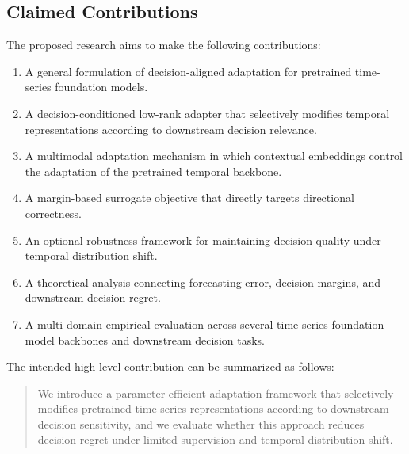 \documentclass[11pt]{article}
\begin{document}
\subsection{Claimed Contributions}

The proposed research aims to make the following contributions:

\begin{enumerate}
    \item A general formulation of decision-aligned adaptation for pretrained
    time-series foundation models.

    \item A decision-conditioned low-rank adapter that selectively modifies
    temporal representations according to downstream decision relevance.

    \item A multimodal adaptation mechanism in which contextual embeddings
    control the adaptation of the pretrained temporal backbone.

    \item A margin-based surrogate objective that directly targets directional
    correctness.

    \item An optional robustness framework for maintaining decision quality
    under temporal distribution shift.

    \item A theoretical analysis connecting forecasting error, decision
    margins, and downstream decision regret.

    \item A multi-domain empirical evaluation across several time-series
    foundation-model backbones and downstream decision tasks.
\end{enumerate}

The intended high-level contribution can be summarized as follows:

\begin{quote}
We introduce a parameter-efficient adaptation framework that selectively
modifies pretrained time-series representations according to downstream
decision sensitivity, and we evaluate whether this approach reduces decision
regret under limited supervision and temporal distribution shift.
\end{quote}
\fi




\end{document}

